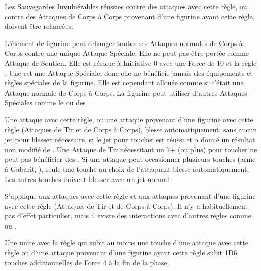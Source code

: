 
Les Sauvegardes Invulnérables réussies contre des attaques avec cette règle, ou contre des Attaques de Corps à Corps provenant d'une figurine ayant cette règle, doivent être relancées.


L'élément de figurine peut échanger toutes ses Attaques normales de Corps à Corps contre une unique Attaque Spéciale. Elle ne peut pas être portée comme Attaque de Soutien. Elle est résolue à Initiative 0 avec une Force de 10 et la règle \multiplewounds{\ordnance}{}. Une \crushattack{} est une Attaque Spéciale, donc elle ne bénéficie jamais des équipements et règles spéciales de la figurine. Elle est cependant allouée comme si c'était une Attaque normale de Corps à Corps. La figurine peut utiliser d'autres Attaques Spéciales comme le \stomp{} ou des \impacthits{}.


Une attaque avec cette règle, ou une attaque provenant d'une figurine avec cette règle (Attaques de Tir et de Corps à Corps), blesse automatiquement, sans aucun jet pour blesser nécessaire, si le jet pour toucher est réussi et a donné un résultat non modifié de . Une Attaque de Tir nécessitant un 7+ (ou plus) pour toucher ne peut pas bénéficier des \poisonedattacks{}. Si une attaque peut occasionner plusieurs touches (arme à Gabarit, \boltthrower{}), seule une touche au choix de l'attaquant blesse automatiquement. Les autres touches doivent blesser avec un jet normal.


S'applique aux attaques avec cette règle et aux attaques provenant d'une figurine avec cette règle (Attaques de Tir et de Corps à Corps). Il n'y a habituellement pas d'effet particulier, mais il existe des interactions avec d'autres règles comme \flammable{} ou \regeneration{}.


Une unité avec la règle \fly{} qui subit au moins une touche d'une attaque avec cette règle ou d'une attaque provenant d'une figurine ayant cette règle subit 1D6 touches additionnelles de Force 4 à la fin de la phase.


